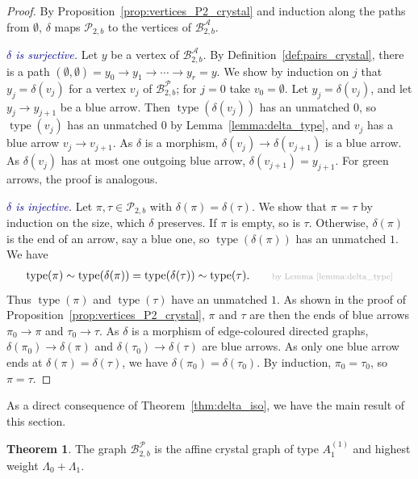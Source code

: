 \documentclass[11pt]{article}
\theoremstyle{definition}
\newtheorem{theorem}{Theorem}[section]
\theoremstyle{remark}
\theoremstyle{definition}
\numberwithin{equation}{section}
\newcommand{\type}{\operatorname{type}}
\renewcommand\emph[1]{\textcolor{darkblue}{\it #1}}
\begin{document}
\begin{proof}
By Proposition~\ref{prop:vertices_P2_crystal} and induction along the paths from $\emptyset$, $\delta$ maps $\mathcal{P}_{2,b}$ to the vertices of $\mathcal{B}_{2,b}^{\mathcal{A}}$.

\emph{$\delta$ is surjective.} Let $y$ be a vertex of $\mathcal{B}_{2,b}^{\mathcal{A}}$. By Definition~\ref{def:pairs_crystal}, there is a path $(\emptyset,\emptyset)=y_0\to y_1\to\cdots\to y_r=y$. We show by induction on $j$ that $y_j=\delta(v_j)$ for a vertex $v_j$ of $\mathcal{B}_{2,b}^{\mathcal{P}}$; for $j=0$ take $v_0=\emptyset$. Let $y_j=\delta(v_j)$, and let $y_j\to y_{j+1}$ be a blue arrow. Then $\type(\delta(v_j))$ has an unmatched $0$, so $\type(v_j)$ has an unmatched $0$ by Lemma~\ref{lemma:delta_type}, and $v_j$ has a blue arrow $v_j\to v_{j+1}$. As $\delta$ is a morphism, $\delta(v_j)\to\delta(v_{j+1})$ is a blue arrow. As $\delta(v_j)$ has at most one outgoing blue arrow, $\delta(v_{j+1})=y_{j+1}$. For green arrows, the proof is analogous.

\emph{$\delta$ is injective.} Let $\pi,\tau\in\mathcal{P}_{2,b}$ with $\delta(\pi)=\delta(\tau)$. We show that $\pi=\tau$ by induction on the size, which $\delta$ preserves. If $\pi$ is empty, so is $\tau$. Otherwise, $\delta(\pi)$ is the end of an arrow, say a blue one, so $\type(\delta(\pi))$ has an unmatched $1$. We have
\begin{align}
\type(\pi)\sim\type(\delta(\pi))=\type(\delta(\tau))\sim\type(\tau).
\qquad{\scriptstyle\textcolor{gray!60}{\text{by Lemma~\ref{lemma:delta_type}}}}
\end{align}
Thus $\type(\pi)$ and $\type(\tau)$ have an unmatched $1$. As shown in the proof of Proposition~\ref{prop:vertices_P2_crystal}, $\pi$ and $\tau$ are then the ends of blue arrows $\pi_0\to\pi$ and $\tau_0\to\tau$. As $\delta$ is a morphism of edge-coloured directed graphs, $\delta(\pi_0)\to\delta(\pi)$ and $\delta(\tau_0)\to\delta(\tau)$ are blue arrows. As only one blue arrow ends at $\delta(\pi)=\delta(\tau)$, we have $\delta(\pi_0)=\delta(\tau_0)$. By induction, $\pi_0=\tau_0$, so $\pi=\tau$.
\end{proof}

As a direct consequence of Theorem~\ref{thm:delta_iso}, we have the main result of this section.

\begin{theorem}\label{thm:grounded_crystal_b}
  The graph \(\mathcal{B}_{2,b}^{\mathcal{P}}\) is the affine crystal graph
  of type \(A_1^{(1)}\) and highest weight \(\Lambda_0+\Lambda_1\).
\end{theorem}
\end{document}
